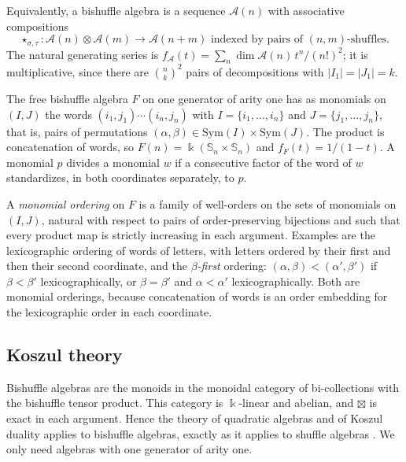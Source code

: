 \documentclass[11pt]{amsart}
\theoremstyle{definition}
\theoremstyle{remark}
\newcommand{\bS}{\mathbb{S}}
\newcommand{\kk}{\Bbbk}
\newcommand{\Sym}{\mathrm{Sym}}
\newcommand{\cA}{\mathscr{A}}
\begin{document}
Equivalently, a bishuffle algebra is a sequence $\cA(n)$ with associative compositions 
$$\star_{\sigma,\tau}\colon\cA(n)\otimes\cA(m)\to\cA(n+m) \text{ indexed by pairs of $(n,m)$-shuffles.} $$
The natural generating series is $f_\cA(t)=\sum_n\dim\cA(n)\,t^n/(n!)^2$; it is multiplicative, since there are $\binom nk^2$ pairs of decompositions with $|I_1|=|J_1|=k$.

The free bishuffle algebra $F$ on one generator of arity one has as monomials on $(I,J)$ the words $(i_1,j_1)\cdots(i_n,j_n)$ with $I=\{i_1,\dots,i_n\}$ and $J=\{j_1,\dots,j_n\}$, that is, pairs of permutations $(\alpha,\beta)\in\Sym(I)\times\Sym(J)$. The product is concatenation of words, so $F(n)=\kk(\bS_n\times\bS_n)$ and $f_F(t)=1/(1-t)$. A monomial $p$ divides a monomial $w$ if a consecutive factor of the word of $w$ standardizes, in both coordinates separately, to $p$.

A \emph{monomial ordering} on $F$ is a family of well-orders on the sets of monomials on $(I,J)$, natural with respect to pairs of order-preserving bijections and such that every product map is strictly increasing in each argument. Examples are the lexicographic ordering of words of letters, with letters ordered by their first and then their second coordinate, and the \emph{$\beta$-first} ordering: $(\alpha,\beta)<(\alpha',\beta')$ if $\beta<\beta'$ lexicographically, or $\beta=\beta'$ and $\alpha<\alpha'$ lexicographically. Both are monomial orderings, because concatenation of words is an order embedding for the lexicographic order in each coordinate.

\subsection{Koszul theory}\label{sec:koszul}

Bishuffle algebras are the monoids in the monoidal category of bi-collections with the bishuffle tensor product. This category is $\kk$-linear and abelian, and $\boxtimes$ is exact in each argument. Hence the theory of quadratic algebras and of Koszul duality \cite{Priddy,PP,LV} applies to bishuffle algebras, exactly as it applies to shuffle algebras \cite{DK}. We only need algebras with one generator of arity one.
\end{document}
